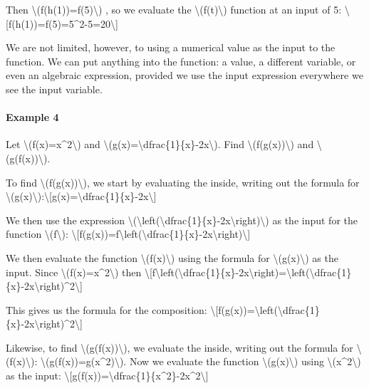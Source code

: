 Then \textbackslash{}(f(h(1))=f(5)\textbackslash{}) , so we evaluate the
\textbackslash{}(f(t)\textbackslash{}) function at an input of 5:
\textbackslash{}{[}f(h(1))=f(5)=5\^{}2-5=20\textbackslash{}{]}

We are not limited, however, to using a numerical value as the input to
the function. We can put anything into the function: a value, a
different variable, or even an algebraic expression, provided we use the
input expression everywhere we see the input variable.

\hypertarget{example-4}{%
\paragraph{Example 4}\label{example-4}}

Let \textbackslash{}(f(x)=x\^{}2\textbackslash{}) and
\textbackslash{}(g(x)=\textbackslash{}dfrac\{1\}\{x\}-2x\textbackslash{}).
Find \textbackslash{}(f(g(x))\textbackslash{}) and
\textbackslash{}(g(f(x))\textbackslash{}).

To find \textbackslash{}(f(g(x))\textbackslash{}), we start by
evaluating the inside, writing out the formula for
\textbackslash{}(g(x)\textbackslash{}):\textbackslash{}{[}g(x)=\textbackslash{}dfrac\{1\}\{x\}-2x\textbackslash{}{]}

We then use the expression
\textbackslash{}(\textbackslash{}left(\textbackslash{}dfrac\{1\}\{x\}-2x\textbackslash{}right)\textbackslash{})
as the input for the function \textbackslash{}(f\textbackslash{}):
\textbackslash{}{[}f(g(x))=f\textbackslash{}left(\textbackslash{}dfrac\{1\}\{x\}-2x\textbackslash{}right)\textbackslash{}{]}

We then evaluate the function \textbackslash{}(f(x)\textbackslash{})
using the formula for \textbackslash{}(g(x)\textbackslash{}) as the
input. Since \textbackslash{}(f(x)=x\^{}2\textbackslash{}) then
\textbackslash{}{[}f\textbackslash{}left(\textbackslash{}dfrac\{1\}\{x\}-2x\textbackslash{}right)=\textbackslash{}left(\textbackslash{}dfrac\{1\}\{x\}-2x\textbackslash{}right)\^{}2\textbackslash{}{]}

This gives us the formula for the composition:
\textbackslash{}{[}f(g(x))=\textbackslash{}left(\textbackslash{}dfrac\{1\}\{x\}-2x\textbackslash{}right)\^{}2\textbackslash{}{]}

Likewise, to find \textbackslash{}(g(f(x))\textbackslash{}), we evaluate
the inside, writing out the formula for
\textbackslash{}(f(x)\textbackslash{}):
\textbackslash{}(g(f(x))=g(x\^{}2)\textbackslash{}). Now we evaluate the
function \textbackslash{}(g(x)\textbackslash{}) using
\textbackslash{}(x\^{}2\textbackslash{}) as the input:
\textbackslash{}{[}g(f(x))=\textbackslash{}dfrac\{1\}\{x\^{}2\}-2x\^{}2\textbackslash{}{]}

